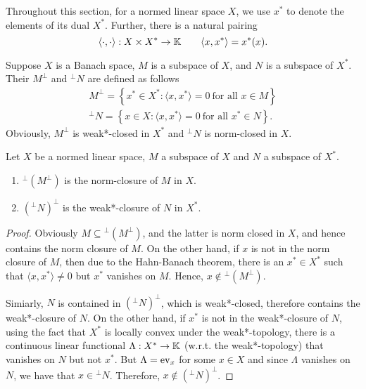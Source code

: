 Throughout this section, for a normed linear space $X$, we use $x^\ast$ to denote the elements of its dual $X^\ast$. Further, there is a natural pairing 
\begin{equation*}
    \langle\cdot,\cdot\rangle: X\times X^\ast\to\mathbb{K}\qquad\langle x, x^\ast\rangle = x^\ast(x).
\end{equation*}

\begin{definition}
    Suppose $X$ is a Banach space, $M$ is a subspace of $X$, and $N$ is a subspace of $X^\ast$. Their  $M^\perp$ and ${}^\perp N$ are defined as follows 
    \begin{align*}
        M^\perp = \left\{x^\ast\in X^\ast\colon\langle x, x^\ast\rangle = 0~\text{for all }x\in M\right\}\\
        ^\perp N = \left\{x\in X\colon \langle x, x^\ast\rangle = 0~\text{for all }x^\ast\in N\right\}.
    \end{align*}
    Obviously, $M^\perp$ is weak*-closed in $X^\ast$ and $^\perp N$ is norm-closed in $X$.
\end{definition}

\begin{theorem}
    Let $X$ be a normed linear space, $M$ a subspace of $X$ and $N$ a subspace of $X^\ast$. 
    \begin{enumerate}[label=(\alph*)]
        \item $^\perp(M^\perp)$ is the norm-closure of $M$ in $X$. 
        \item $({}^\perp N)^\perp$ is the weak*-closure of $N$ in $X^\ast$.
    \end{enumerate}
\end{theorem}
\begin{proof}
    Obviously $M\subseteq {}^\perp(M^\perp)$, and the latter is norm closed in $X$, and hence contains the norm closure of $M$. On the other hand, if $x$ is not in the norm closure of $M$, then due to the Hahn-Banach theorem, there is an $x^\ast\in X^\ast$ such that $\langle x, x^\ast\rangle\ne 0$ but $x^\ast$ vanishes on $M$. Hence, $x\notin {}^\perp(M^\perp)$.

    Simiarly, $N$ is contained in $({}^\perp N)^\perp$, which is weak*-closed, therefore contains the weak*-closure of $N$. On the other hand, if $x^\ast$ is not in the weak*-closure of $N$, using the fact that $X^\ast$ is locally convex under the weak*-topology, there is a continuous linear functional $\Lambda: X^\ast\to\mathbb{K}$ (w.r.t. the weak*-topology) that vanishes on $N$ but not $x^\ast$. But $\Lambda = \operatorname{ev}_x$ for some $x\in X$ and since $\Lambda$ vanishes on $N$, we have that $x\in {}^\perp N$. Therefore, $x\notin({}^\perp N)^\perp$.
\end{proof}

